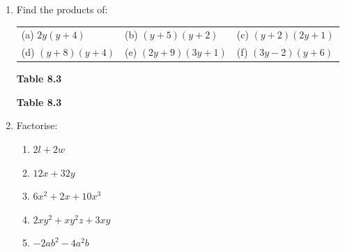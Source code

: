           \label{m39383*id270174}\begin{enumerate}[noitemsep, label=\textbf{\arabic*}. ] 
            \label{m39383*uid9}\item Find the products of:
          \begin{table}[H]
        \begin{center}
      \label{m39383*id270189}
    \noindent
      \tablelasttail{}
      \begin{xtabular}[t]{|l|l|l|}\hline
        (a) $2y\left(y+4\right)$ &
        (b) $\left(y+5\right)\left(y+2\right)$ &
        (c) $\left(y+2\right)\left(2y+1\right)$%
     \tabularnewline{}
        (d) $\left(y+8\right)\left(y+4\right)$ &
        (e) $\left(2y+9\right)\left(3y+1\right)$ &
        (f) $\left(3y-2\right)\left(y+6\right)$%
     \tabularnewline{}
    \end{xtabular}
      \end{center}
    \begin{center}{\small\bfseries Table 8.3}\end{center}
    \begin{caption}{\small\bfseries Table 8.3}\end{caption}
\end{table}
    \par
  \newline
\newline
        \label{m39383*uid10}\item Factorise:
\label{m39383*id270414}\begin{enumerate}[noitemsep, label=\textbf{\alph*}. ] 
            \label{m39383*uid11}\item $2l+2w$\label{m39383*uid12}\item $12x+32y$\label{m39383*uid13}\item $6{x}^{2}+2x+10{x}^{3}$\label{m39383*uid14}\item $2x{y}^{2}+x{y}^{2}z+3xy$\label{m39383*uid15}\item $-2a{b}^{2}-4{a}^{2}b$\end{enumerate}

\end{enumerate}
